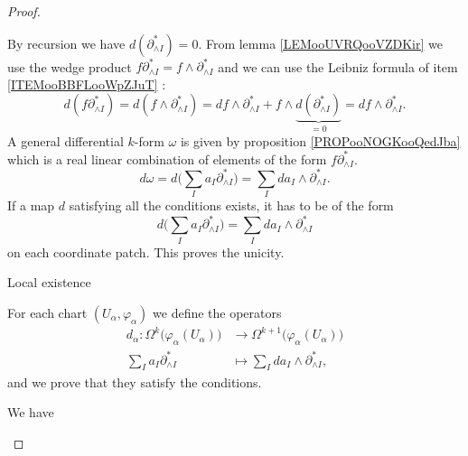 \begin{proof}
\begin{subproof}
		By recursion we have \( d(\partial^*_{\wedge I})=0\).
		From lemma \ref{LEMooUVRQooVZDKir} we use the wedge product \(  f\partial^*_{\wedge I}=f\wedge \partial^*_{\wedge I} \) and we can use the Leibniz formula of item \ref{ITEMooBBFLooWpZJuT} :
		\begin{equation}
			d(f\partial^*_{\wedge I})=d(f\wedge\partial^*_{\wedge I})=df\wedge \partial^*_{\wedge I}+f\wedge \underbrace{d(\partial^*_{\wedge I})}_{=0}=df\wedge\partial^*_{\wedge I}.
		\end{equation}
		A general differential \( k\)-form \( \omega\) is given by proposition \ref{PROPooNOGKooQedJba} which is a real linear combination of elements of the form \( f\partial^*_{\wedge I}\).
		\begin{equation}		\label{EQooMGAVooCndFmv}
			d\omega=d\big( \sum_Ia_I\partial^*_{\wedge I} \big)=\sum_Ida_I\wedge \partial^*_{\wedge I}.
		\end{equation}
		\spitem[Unicity]
		If a map \( d\) satisfying all the conditions exists, it has to be of the form
		\begin{equation}
			d\big( \sum_Ia_I\partial^*_{\wedge I} \big)=\sum_Ida_I\wedge \partial^*_{\wedge I}
		\end{equation}
		on each coordinate patch. This proves the unicity.
	\end{subproof}
	\begin{proofpart}
		Local existence
	\end{proofpart}
	For each chart \( (U_{\alpha}, \varphi_{\alpha})\) we define the operators
	\begin{equation}
		\begin{aligned}
			d_{\alpha} \colon \Omega^k\big( \varphi_{\alpha}(U_{\alpha}) \big) & \to \Omega^{k+1}\big( \varphi_{\alpha}(U_{\alpha}) \big) \\
			\sum_Ia_I\partial^*_{\wedge I}                                     & \mapsto \sum_Ida_I\wedge\partial^*_{\wedge I},
		\end{aligned}
	\end{equation}
	and we prove that they satisfy the conditions.
	\begin{subproof}
		We have
		\begin{equation}

\end{equation}
\end{subproof}
\end{proof}
